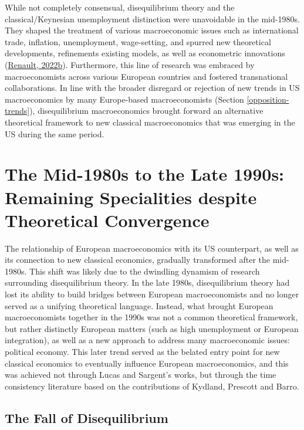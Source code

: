 \documentclass[
  12pt,
  onecolumn]{article}
\begin{document}
While not completely consensual, disequilibrium theory and the
classical/Keynesian unemployment distinction were unavoidable in the
mid-1980s. They shaped the treatment of various macroeconomic issues
such as international trade, inflation, unemployment, wage-setting, and
spurred new theoretical developments, refinements existing models, as
well as econometric innovations
(\protect\hyperlink{ref-renault2019}{Renault, 2022b}). Furthermore, this
line of research was embraced by macroeconomists across various European
countries and fostered transnational collaborations. In line with the
broader disregard or rejection of new trends in US macroeconomics by
many Europe-based macroeconomists (Section \ref{opposition-trends}),
disequilibrium macroeconomics brought forward an alternative theoretical
framework to new classical macroeconomics that was emerging in the US
during the same period.

\hypertarget{period2}{%
\section{The Mid-1980s to the Late 1990s: Remaining Specialities despite
Theoretical Convergence}\label{period2}}

The relationship of European macroeconomics with its US counterpart, as
well as its connection to new classical economics, gradually transformed
after the mid-1980s. This shift was likely due to the dwindling dynamism
of research surrounding disequilibrium theory. In the late 1980s,
disequilibrium theory had lost its ability to build bridges between
European macroeconomists and no longer served as a unifying theoretical
language. Instead, what brought European macroeconomists together in the
1990s was not a common theoretical framework, but rather distinctly
European matters (such as high unemployment or European integration), as
well as a new approach to address many macroeconomic issues: political
economy. This later trend served as the belated entry point for new
classical economics to eventually influence European macroeconomics, and
this was achieved not through Lucas and Sargent's works, but through the
time consistency literature based on the contributions of Kydland,
Prescott and Barro.

\hypertarget{disequilibrium-fall}{%
\subsection{The Fall of Disequilibrium}\label{disequilibrium-fall}}
\end{document}
